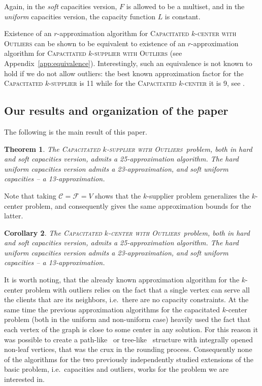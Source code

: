 \documentclass{article}
\newcommand{\F}{\mathcal{F}}
\newcommand{\C}{\mathcal{C}}
\newcommand{\fullsup}{\textsc{Capacitated} $k$-\textsc{supplier with Outliers}}
\newcommand{\fullcen}{\textsc{Capacitated} $k$-\textsc{center with Outliers}}
\theoremstyle{plain}
\newtheorem{theorem}{Theorem}
\newtheorem{corollary}[theorem]{Corollary}
\theoremstyle{definition}
\begin{document}
Again, in the \emph{soft} capacities version, $F$ is allowed to be a multiset,
and in the \emph{uniform} capacities version, the capacity function $L$ is
constant.

Existence of an $r$-approximation algorithm for \textsc{Capacitated} $k$-\textsc{center with Outliers}
can be shown to be equivalent to existence of an $r$-approximation algorithm for \textsc{Capacitated} $k$-\textsc{supplier with Outliers}
(see Appendix~\ref{app:equivalence}).
Interestingly, such an equivalence is not known to hold if we do not allow outliers:
the best known approximation factor for the \textsc{Capacitated} $k$-\textsc{supplier} is 11
while for the \textsc{Capacitated} $k$-\textsc{center} it is 9, see \cite{svensson}.


\subsection{Our results and organization of the paper}

The following is the main result of this paper.

\begin{theorem}
The \fullsup\ 
problem, both in hard and soft
capacities version, admits a 25-approximation algorithm.
The hard uniform capacities version admits a 23-approximation, and soft uniform
capacities -- a 13-approximation.
\end{theorem}
Note that taking $\C=\F=V$ shows that 
the $k$-supplier problem generalizes the $k$-center problem, 
and consequently gives the same approximation bounds for the latter.
\begin{corollary}
The \fullcen\ 
problem, both in hard and soft
capacities version, admits a 25-approximation algorithm. 
The hard uniform capacities version admits a 23-approximation, and soft uniform
capacities -- a 13-approximation.
\end{corollary}

It is worth noting, that the already known approximation algorithm
for the $k$-center problem with outliers relies on the fact 
that a single vertex can serve all the clients that are its neighbors,
i.e.\ there are no capacity constraints.
At the same time the previous approximation algorithms
for the capacitated $k$-center problem (both in the uniform
and non-uniform case) heavily used the fact that 
each vertex of the graph is close to some center in any solution.
For this reason it was possible to create a path-like~\cite{chk-focs12}
or tree-like~\cite{svensson} structure
with integrally opened non-leaf vertices, that was the crux in
the rounding process. 
Consequently none of the algorithms for the two previously independently
studied extensions of the basic problem, i.e.\ capacities and outliers,
works for the problem we are interested in.
\end{document}
